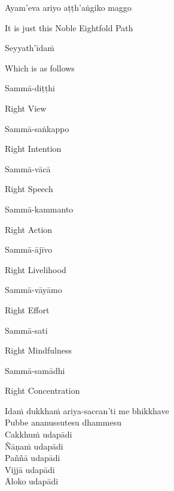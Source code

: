 Ayam'eva ariyo aṭṭh'aṅgiko maggo

\begin{english}
  It is just this Noble Eightfold Path
\end{english}

Seyyath'īdaṁ

\begin{english}
  Which is as follows
\end{english}

Sammā-diṭṭhi

\begin{english}
  Right View
\end{english}

Sammā-saṅkappo

\begin{english}
  Right Intention
\end{english}

Sammā-vācā

\begin{english}
  Right Speech
\end{english}

Sammā-kammanto

\begin{english}
  Right Action
\end{english}

Sammā-ājīvo

\begin{english}
  Right Livelihood
\end{english}

Sammā-vāyāmo

\begin{english}
  Right Effort
\end{english}

Sammā-sati

\begin{english}
  Right Mindfulness
\end{english}

Sammā-samādhi

\begin{english}
  Right Concentration
\end{english}

Idaṁ dukkhaṁ ariya-saccan'ti me bhikkhave\\
Pubbe ananussutesu dhammesu\\
Cakkhuṁ udapādi\\
Ñāṇaṁ udapādi\\
Paññā udapādi\\
Vijjā udapādi\\
Āloko udapādi

